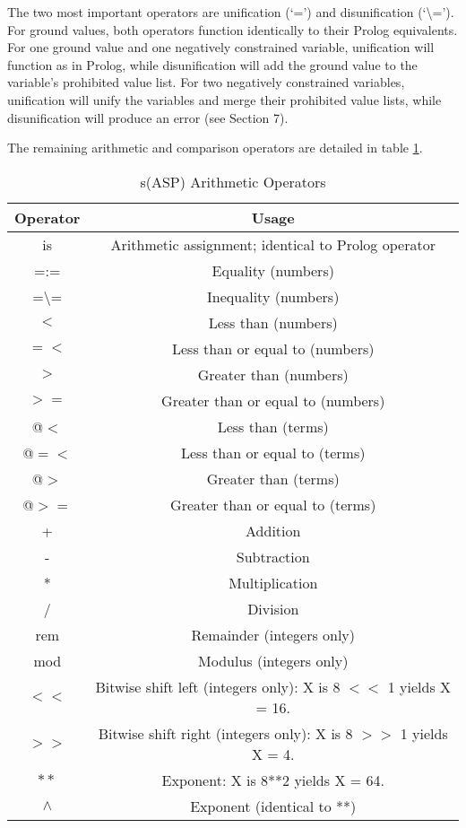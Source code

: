 \documentclass[]{article}
\begin{document}
The two most important operators are unification (`=') and disunification
(`\textbackslash ='). For ground values, both operators function identically to their Prolog
equivalents. For one ground value and one negatively constrained variable,
unification will function as in Prolog, while disunification will add the ground
value to the variable's prohibited value list. For two negatively constrained
variables, unification will unify the variables and merge their prohibited value
lists, while disunification will produce an error (see Section 7).

The remaining arithmetic and comparison operators are detailed in table \ref{tab:operators}.

\begin{table}[htb]
	\begin{tabular}{|c|c|}
		\hline Operator & Usage \\ 
		\hline is & Arithmetic assignment; identical to Prolog operator \\ 
		\hline =:= & Equality (numbers) \\
		\hline =\textbackslash = & Inequality (numbers) \\
		\hline $<$ & Less than (numbers) \\
		\hline $=<$ & Less than or equal to (numbers) \\
		\hline $>$ & Greater than (numbers) \\
		\hline $>=$ & Greater than or equal to (numbers) \\
		\hline @$<$ & Less than (terms) \\
		\hline @$=<$ & Less than or equal to (terms) \\
		\hline @$>$ & Greater than (terms) \\
		\hline @$>=$ & Greater than or equal to (terms) \\
		\hline + & Addition \\
		\hline - & Subtraction \\
		\hline * & Multiplication \\
		\hline / & Division \\
		\hline rem & Remainder (integers only) \\
		\hline mod & Modulus (integers only) \\
		\hline $<<$ & Bitwise shift left (integers only): X is 8 $<<$ 1 yields X = 16. \\
		\hline $>>$ & Bitwise shift right (integers only): X is 8 $>>$ 1 yields X = 4. \\
		\hline $**$ & Exponent: X is 8**2 yields X = 64. \\
		\hline $\wedge$ & Exponent (identical to **) \\
		\hline 
	\end{tabular}
	\caption{s(ASP) Arithmetic Operators}
	\label{tab:operators}
\end{table}
\end{document}
